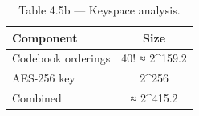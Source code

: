 \begin{table}[htbp]
\centering
\caption{Table 4.5b — Keyspace analysis.}
\label{tab:table_4_5_keyspace}
\begin{tabular}{lc}
\hline
Component & Size \\
\hline
Codebook orderings & 40! ≈ 2^159.2 \\
AES-256 key & 2^256 \\
Combined & ≈ 2^415.2 \\
\hline
\end{tabular}
\end{table}
